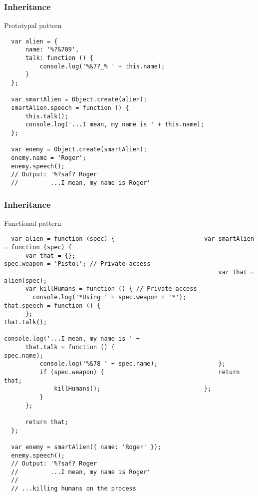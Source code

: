 \begin{frame}[fragile]
  \frametitle{Inheritance}

  \begin{block}{Prototypal pattern}
  {\tiny
  \begin{verbatim}
  var alien = {
      name: '%?&789',
      talk: function () {
          console.log('%&7?_% ' + this.name);
      }
  };

  var smartAlien = Object.create(alien);
  smartAlien.speech = function () {
      this.talk();
      console.log('...I mean, my name is ' + this.name);
  };

  var enemy = Object.create(smartAlien);
  enemy.name = 'Roger';
  enemy.speech(); 
  // Output: '%?saf? Roger
  //         ...I mean, my name is Roger'
  \end{verbatim}
  }
  \end{block}
\end{frame}

\begin{frame}[fragile]
  \frametitle{Inheritance}

  \begin{block}{Functional pattern}
  {\tiny
  \begin{verbatim}
  var alien = function (spec) {                         var smartAlien = function (spec) {
      var that = {};                                        spec.weapon = 'Pistol'; // Private access
                                                            var that = alien(spec);
      var killHumans = function () { // Private access                                                             
        console.log('*Using ' + spec.weapon + '*');         that.speech = function () {
      };                                                        that.talk();
                                                                console.log('...I mean, my name is ' +
      that.talk = function () {                                   spec.name);
          console.log('%&78 ' + spec.name);                 };                                                       
          if (spec.weapon) {                                return that;
              killHumans();                             };
          }
      };

      return that;
  };

  var enemy = smartAlien({ name: 'Roger' });
  enemy.speech(); 
  // Output: '%?saf? Roger
  //         ...I mean, my name is Roger'
  //
  // ...killing humans on the process
  \end{verbatim}
  }
  \end{block}
\end{frame}

